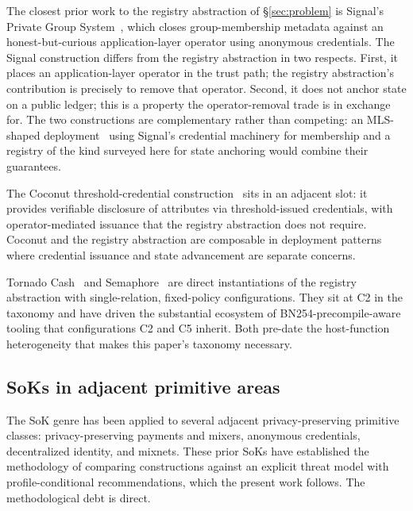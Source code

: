 The closest prior work to the registry abstraction of
\S\ref{sec:problem} is Signal's Private Group
System~\cite{chase-2020-signal-pgs}, which closes group-membership
metadata against an honest-but-curious application-layer operator
using anonymous credentials. The Signal construction differs from
the registry abstraction in two respects. First, it places an
application-layer operator in the trust path; the registry
abstraction's contribution is precisely to remove that operator.
Second, it does not anchor state on a public ledger; this is a
property the operator-removal trade is in exchange for. The two
constructions are complementary rather than competing: an MLS-shaped
deployment~\cite{rfc9420-mls} using Signal's credential machinery
for membership and a registry of the kind surveyed here for state
anchoring would combine their guarantees.

The Coconut threshold-credential
construction~\cite{sonnino-2019-coconut} sits in an adjacent slot:
it provides verifiable disclosure of attributes via threshold-issued
credentials, with operator-mediated issuance that the registry
abstraction does not require. Coconut and the registry abstraction
are composable in deployment patterns where credential issuance and
state advancement are separate concerns.

Tornado Cash~\cite{pertsev-2019-tornado} and
Semaphore~\cite{semaphore-2024} are direct instantiations of the
registry abstraction with single-relation, fixed-policy
configurations. They sit at C2 in the taxonomy and have driven the
substantial ecosystem of BN254-precompile-aware tooling that
configurations C2 and C5 inherit. Both pre-date the host-function
heterogeneity that makes this paper's taxonomy necessary.

\subsection{SoKs in adjacent primitive areas}

The SoK genre has been applied to several adjacent privacy-preserving
primitive classes: privacy-preserving payments and mixers,
anonymous credentials, decentralized identity, and mixnets. These
prior SoKs have established the methodology of comparing
constructions against an explicit threat model with profile-conditional
recommendations, which the present work follows. The methodological
debt is direct.

